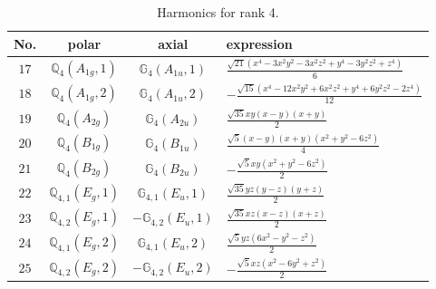 \documentclass[fleqn,8pt,landscape]{jsarticle}
\begin{document}
\begin{table}[ht!]
\begin{center}
\caption{Harmonics for rank 4.}
\renewcommand{\arraystretch}{1.3}
\begin{tabular}{cccl} \hline \hline
No. & polar & axial & expression \\ \hline
$ 17 $ & $ \mathbb{Q}_{4}(A_{1g},1) $ & $ \mathbb{G}_{4}(A_{1u},1) $ & $ \frac{\sqrt{21} \left(x^{4} - 3 x^{2} y^{2} - 3 x^{2} z^{2} + y^{4} - 3 y^{2} z^{2} + z^{4}\right)}{6} $ \\
$ 18 $ & $ \mathbb{Q}_{4}(A_{1g},2) $ & $ \mathbb{G}_{4}(A_{1u},2) $ & $ - \frac{\sqrt{15} \left(x^{4} - 12 x^{2} y^{2} + 6 x^{2} z^{2} + y^{4} + 6 y^{2} z^{2} - 2 z^{4}\right)}{12} $ \\
$ 19 $ & $ \mathbb{Q}_{4}(A_{2g}) $ & $ \mathbb{G}_{4}(A_{2u}) $ & $ \frac{\sqrt{35} x y \left(x - y\right) \left(x + y\right)}{2} $ \\
$ 20 $ & $ \mathbb{Q}_{4}(B_{1g}) $ & $ \mathbb{G}_{4}(B_{1u}) $ & $ \frac{\sqrt{5} \left(x - y\right) \left(x + y\right) \left(x^{2} + y^{2} - 6 z^{2}\right)}{4} $ \\
$ 21 $ & $ \mathbb{Q}_{4}(B_{2g}) $ & $ \mathbb{G}_{4}(B_{2u}) $ & $ - \frac{\sqrt{5} x y \left(x^{2} + y^{2} - 6 z^{2}\right)}{2} $ \\
$ 22 $ & $ \mathbb{Q}_{4,1}(E_{g},1) $ & $ \mathbb{G}_{4,1}(E_{u},1) $ & $ \frac{\sqrt{35} y z \left(y - z\right) \left(y + z\right)}{2} $ \\
$ 23 $ & $ \mathbb{Q}_{4,2}(E_{g},1) $ & $ -\mathbb{G}_{4,2}(E_{u},1) $ & $ \frac{\sqrt{35} x z \left(x - z\right) \left(x + z\right)}{2} $ \\
$ 24 $ & $ \mathbb{Q}_{4,1}(E_{g},2) $ & $ \mathbb{G}_{4,1}(E_{u},2) $ & $ \frac{\sqrt{5} y z \left(6 x^{2} - y^{2} - z^{2}\right)}{2} $ \\
$ 25 $ & $ \mathbb{Q}_{4,2}(E_{g},2) $ & $ -\mathbb{G}_{4,2}(E_{u},2) $ & $ - \frac{\sqrt{5} x z \left(x^{2} - 6 y^{2} + z^{2}\right)}{2} $ \\
 \hline \hline
\end{tabular}
\end{center}
\end{table}
\end{document}
